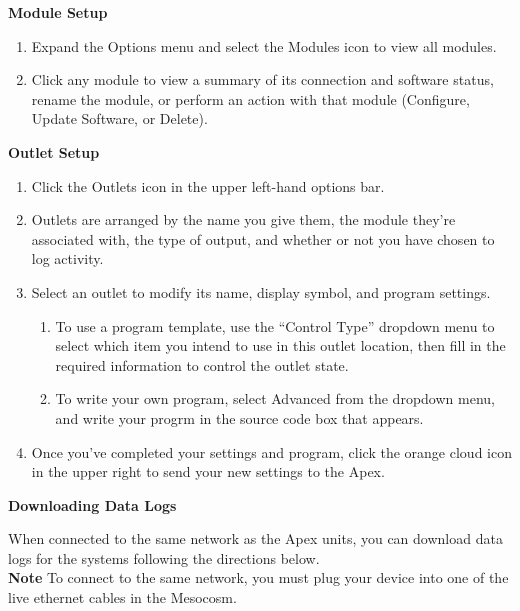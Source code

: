 \documentclass[]{book}
\providecommand{\tightlist}{%
  \setlength{\itemsep}{0pt}\setlength{\parskip}{0pt}}
\begin{document}
 \textbf{Module Setup}

\begin{enumerate}
\def\labelenumi{\arabic{enumi}.}
\tightlist
\item
  Expand the Options menu and select the Modules icon to view all
  modules.
\item
  Click any module to view a summary of its connection and software
  status, rename the module, or perform an action with that module
  (Configure, Update Software, or Delete).
\end{enumerate}

 \textbf{Outlet Setup}

\begin{enumerate}
\def\labelenumi{\arabic{enumi}.}
\tightlist
\item
  Click the Outlets icon in the upper left-hand options bar.
\item
  Outlets are arranged by the name you give them, the module they're
  associated with, the type of output, and whether or not you have
  chosen to log activity.
\item
  Select an outlet to modify its name, display symbol, and program
  settings.

  \begin{enumerate}
  \def\labelenumii{\arabic{enumii}.}
  \tightlist
  \item
    To use a program template, use the ``Control Type'' dropdown menu to
    select which item you intend to use in this outlet location, then
    fill in the required information to control the outlet state.
  \item
    To write your own program, select Advanced from the dropdown menu,
    and write your progrm in the source code box that appears.
  \end{enumerate}
\item
  Once you've completed your settings and program, click the orange
  cloud icon in the upper right to send your new settings to the Apex.
\end{enumerate}

 \textbf{Downloading Data Logs}

When connected to the same network as the Apex units, you can download
data logs for the systems following the directions below.\\
\textbf{Note} To connect to the same network, you must plug your device
into one of the live ethernet cables in the Mesocosm.
\end{document}
